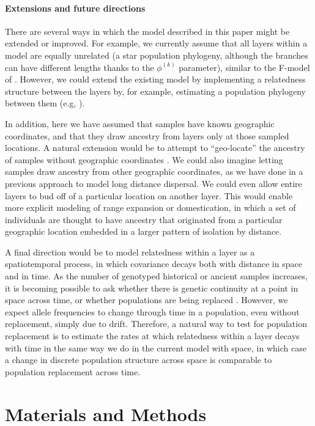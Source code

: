 \documentclass[10pt,letterpaper]{article}
\begin{document}
\paragraph{Extensions and future directions}
There are several ways in which the model described in this paper might be extended or improved.  
For example, we currently assume that all layers within a model are equally unrelated 
(a star population phylogeny, although the branches can have different lengths thanks to the $\phi^{(k)}$ parameter), 
similar to the F-model of \cite{falush2003}.
However, we could extend the existing model by implementing 
a relatedness structure between the layers by, for example, 
estimating a population phylogeny between them
(e.g, \cite{treemix}).

In addition, here we have assumed that samples have known geographic coordinates, 
and that they draw ancestry from layers only at those sampled locations. 
A natural extension would be to attempt to ``geo-locate'' 
the ancestry of samples without geographic coordinates \cite{Wasser2004}. 
We could also imagine letting samples draw ancestry from other geographic coordinates, 
as we have done in a previous approach \cite{spacemix} to model long distance dispersal. 
We could even allow entire layers to bud off of a particular location on another layer. 
This would enable more explicit modeling of range expansion or domestication, 
in which a set of individuals are thought to have ancestry that originated from
a particular geographic location embedded in a larger pattern of isolation by distance.

A final direction would be to model relatedness within a layer as a spatiotemporal process, 
in which covariance decays both with distance in space and in time.  
As the number of genotyped historical or ancient samples increases, 
it is becoming possible to ask whether there is genetic continuity at a point in space across time, 
or whether populations are being replaced \cite{lazaridis_ancient_2014, Haak2015, slatkin_racimo2016, Nielsen2017, Schraiber2017}.
However, we expect allele frequencies to change through time in a population, 
even without replacement, simply due to drift.
Therefore, a natural way to test for population replacement is to estimate the rates 
at which relatedness within a layer decays with time in the same way we do in the current model with space, 
in which case a change in discrete population structure across space is comparable to population replacement across time.

\section*{Materials and Methods}
\end{document}

